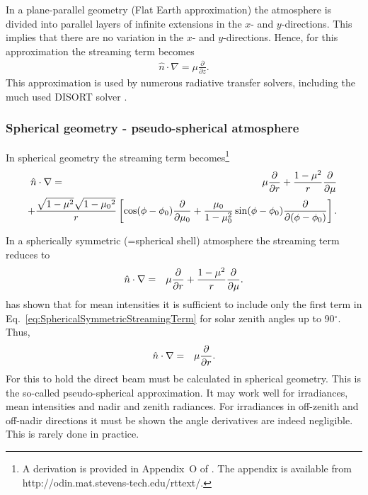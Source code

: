 In a plane-parallel geometry (Flat Earth approximation) the atmosphere
is divided into parallel layers of infinite extensions in the $x$- and
$y$-directions. This implies that there are no variation in the $x$- and
$y$-directions. Hence, for this approximation the streaming term becomes
\begin{eqnarray}
   \hat{n}\cdot \nabla =  \mu \frac{\partial}{\partial z}.
  \label{eq:PlaneParallelStreamingTerm}
\end{eqnarray}
This approximation is used by numerous radiative transfer solvers,
including the much used DISORT solver \citep{Stamnes1988c}.

\subsubsection{Spherical geometry - pseudo-spherical atmosphere}
In spherical geometry the streaming term becomes\footnote{A derivation
is provided in Appendix~O of \citet{Thomas1999}. The appendix is
available from http://odin.mat.stevens-tech.edu/rttext/.} 
\begin{eqnarray}
   \hat{n}\cdot{\bf\nabla} &=& 
\mu\frac{\partial}{\partial r} + 
\frac{1-\mu^{2}}{r}\frac{\partial}{\partial \mu}  \nonumber \\
&&\!\!\!\!\!\!\!\!\!\!\!\!\!\!\!\!\!\!\!\!\!\!\!\!\!\!\!
+ \frac{\sqrt{1-\mu^{2}}\sqrt{1-{\mu_{0}}^{2}}}{r}\left[
\cos(\phi-\phi_{0})\frac{\partial}{\partial \mu_{0}} +
\frac{\mu_{0}}{1-\mu_{0}^{2}}\sin(\phi-\phi_{0})
\frac{\partial}{\partial (\phi-\phi_{0})} 
\right].
  \label{eq:SphericalStreamingTerm}
\end{eqnarray}

In a spherically symmetric (=spherical shell) atmosphere the streaming term reduces to
\begin{eqnarray}
   \hat{n}\cdot{\bf\nabla} &=& 
\mu\frac{\partial}{\partial r} + 
\frac{1-\mu^{2}}{r}\frac{\partial}{\partial \mu}.
  \label{eq:SphericalSymmetricStreamingTerm}
\end{eqnarray}
\citet{Dahlback1991} has shown that for mean intensities it is
sufficient to include only the first term in
Eq.~\ref{eq:SphericalSymmetricStreamingTerm} for solar zenith angles
up to 90$^{\circ}$. Thus, 
\begin{eqnarray}
   \hat{n}\cdot{\bf\nabla} &=& 
\mu\frac{\partial}{\partial r}.
  \label{eq:PseudoSphericalSymmetricStreamingTerm}
\end{eqnarray}
For this to hold the direct beam must be calculated in spherical
geometry. This is the so-called pseudo-spherical approximation. It
may work well for irradiances, mean intensities and nadir and zenith
radiances. For irradiances in off-zenith and off-nadir directions it
must be shown the angle derivatives are indeed negligible. This is
rarely done in practice.

